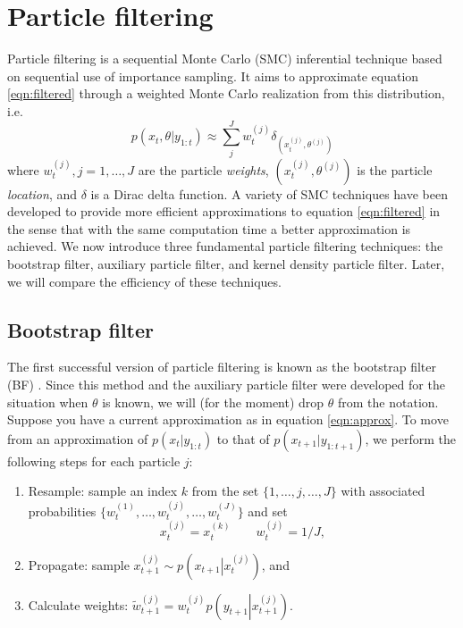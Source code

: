\documentclass{elsarticle}
\begin{document}
\section{Particle filtering \label{sec:filtering}}

Particle filtering is a sequential Monte Carlo (SMC) inferential technique based on sequential use of importance sampling. It aims to approximate equation \eqref{eqn:filtered} through a weighted Monte Carlo realization from this distribution, i.e.
\begin{equation}
p(x_t,\theta| y_{1:t}) \approx \sum_{j}^J w_t^{(j)} \delta_{(x_t^{(j)},\theta^{(j)})} \label{eqn:approx}
\end{equation}
where $w_t^{(j)},j=1,\ldots,J$ are the particle \emph{weights}, $(x_t^{(j)},\theta^{(j)})$ is the particle \emph{location}, and $\delta$ is a Dirac delta function. A variety of SMC techniques have been developed to provide more efficient approximations to equation \eqref{eqn:filtered} in the sense that with the same computation time a better approximation is achieved. We now introduce three fundamental particle filtering techniques: the bootstrap filter, auxiliary particle filter, and kernel density particle filter. Later, we will compare the efficiency of these techniques.

\subsection{Bootstrap filter \label{sec:bf}}

The first successful version of particle filtering is known as the bootstrap filter (BF) \citep{Gord:Salm:Smit:nove:1993}. Since this method and the auxiliary particle filter were developed for the situation when $\theta$ is known, we will (for the moment) drop $\theta$ from the notation. Suppose you have a current approximation as in equation \eqref{eqn:approx}. To move from an approximation of $p(x_t| y_{1:t})$ to that of $p(x_{t+1}| y_{1:t+1})$, we perform the following steps for each particle $j$:

\begin{enumerate}
\item Resample: sample an index $k$ from the set $\{1,\ldots,j,\ldots,J\}$ with associated probabilities $\{w_t^{(1)},\ldots,w_t^{(j)},\ldots,w_t^{(J)}\}$ and set
    \[ x_t^{(j)} = x_t^{(k)} \qquad w_t^{(j)} = 1 / J, \]
\item Propagate: sample $x_{t+1}^{(j)} \sim p\left(\left. x_{t+1}\right|x_t^{(j)}\right)$, and
\item Calculate weights: $\tilde{w}_{t+1}^{(j)} = w_t^{(j)}p\left(y_{t+1}\left|x_{t+1}^{(j)}\right.\right)$.
\end{enumerate}
\end{document}
